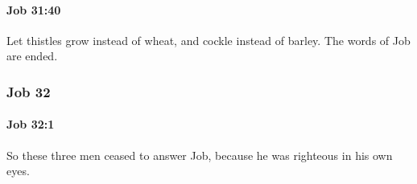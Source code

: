 		\paragraph{Job 31:40} %
			\label{JOB-31-40}

			Let thistles grow instead of wheat, and cockle instead of barley. The words of Job are ended.

	\subsubsection{Job 32} %
		\label{JOB-32}

		\paragraph{Job 32:1} %
			\label{JOB-32-1}

			So these three men ceased to answer Job, because he was righteous in his own eyes.


